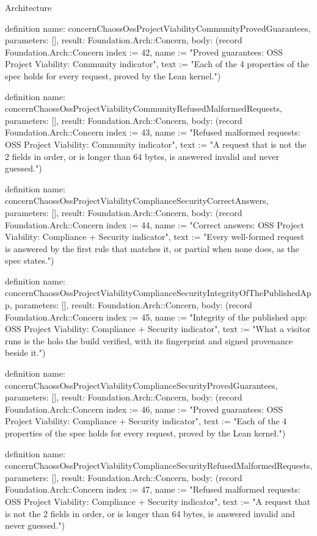 \begin{lexlean}{Architecture}
\begin{semanticmodule}
definition{
  name: concernChaossOssProjectViabilityCommunityProvedGuarantees,
  parameters: [],
  result: Foundation.Arch::Concern,
  body: (record Foundation.Arch::Concern {index := 42, name := "Proved guarantees: OSS Project Viability: Community indicator", text := "Each of the 4 properties of the spec holds for every request, proved by the Lean kernel."})
}

definition{
  name: concernChaossOssProjectViabilityCommunityRefusedMalformedRequests,
  parameters: [],
  result: Foundation.Arch::Concern,
  body: (record Foundation.Arch::Concern {index := 43, name := "Refused malformed requests: OSS Project Viability: Community indicator", text := "A request that is not the 2 fields in order, or is longer than 64 bytes, is answered invalid and never guessed."})
}

definition{
  name: concernChaossOssProjectViabilityComplianceSecurityCorrectAnswers,
  parameters: [],
  result: Foundation.Arch::Concern,
  body: (record Foundation.Arch::Concern {index := 44, name := "Correct answers: OSS Project Viability: Compliance + Security indicator", text := "Every well-formed request is answered by the first rule that matches it, or partial when none does, as the spec states."})
}

definition{
  name: concernChaossOssProjectViabilityComplianceSecurityIntegrityOfThePublishedApp,
  parameters: [],
  result: Foundation.Arch::Concern,
  body: (record Foundation.Arch::Concern {index := 45, name := "Integrity of the published app: OSS Project Viability: Compliance + Security indicator", text := "What a visitor runs is the holo the build verified, with its fingerprint and signed provenance beside it."})
}

definition{
  name: concernChaossOssProjectViabilityComplianceSecurityProvedGuarantees,
  parameters: [],
  result: Foundation.Arch::Concern,
  body: (record Foundation.Arch::Concern {index := 46, name := "Proved guarantees: OSS Project Viability: Compliance + Security indicator", text := "Each of the 4 properties of the spec holds for every request, proved by the Lean kernel."})
}

definition{
  name: concernChaossOssProjectViabilityComplianceSecurityRefusedMalformedRequests,
  parameters: [],
  result: Foundation.Arch::Concern,
  body: (record Foundation.Arch::Concern {index := 47, name := "Refused malformed requests: OSS Project Viability: Compliance + Security indicator", text := "A request that is not the 2 fields in order, or is longer than 64 bytes, is answered invalid and never guessed."})
}


\end{semanticmodule}
\end{lexlean}
